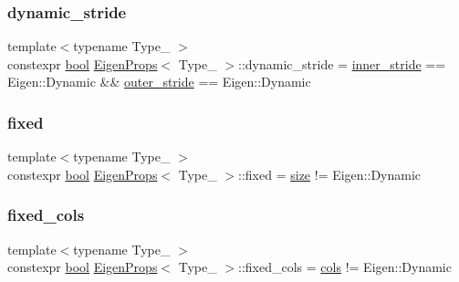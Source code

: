 \mbox{\label{struct_eigen_props_a32861acd4f8d759619f7a3438a5a56a4}} 
\subsubsection{\texorpdfstring{dynamic\_stride}{dynamic\_stride}}
{\footnotesize\ttfamily template$<$typename Type\+\_\+ $>$ \\
constexpr \mbox{\hyperlink{asdl_8h_af6a258d8f3ee5206d682d799316314b1}{bool}} \mbox{\hyperlink{struct_eigen_props}{Eigen\+Props}}$<$ Type\+\_\+ $>$\+::dynamic\+\_\+stride = \mbox{\hyperlink{struct_eigen_props_aadd1cceef220ef97abe8eb74f1f78ecd}{inner\+\_\+stride}} == Eigen\+::\+Dynamic \&\& \mbox{\hyperlink{struct_eigen_props_ac31d9e8cc3baff0f804000486c35759d}{outer\+\_\+stride}} == Eigen\+::\+Dynamic\hspace{0.3cm}{\ttfamily [static]}}

\mbox{\label{struct_eigen_props_a4234c331255e14bd0e2a817ac9e0352e}} 
\subsubsection{\texorpdfstring{fixed}{fixed}}
{\footnotesize\ttfamily template$<$typename Type\+\_\+ $>$ \\
constexpr \mbox{\hyperlink{asdl_8h_af6a258d8f3ee5206d682d799316314b1}{bool}} \mbox{\hyperlink{struct_eigen_props}{Eigen\+Props}}$<$ Type\+\_\+ $>$\+::fixed = \mbox{\hyperlink{_s_d_l__opengl__glext_8h_a3d1e3edfcf61ca2d831883e1afbad89e}{size}} != Eigen\+::\+Dynamic\hspace{0.3cm}{\ttfamily [static]}}

\mbox{\label{struct_eigen_props_afc4954afca9a4dd098b009a5653b2b48}} 
\subsubsection{\texorpdfstring{fixed\_cols}{fixed\_cols}}
{\footnotesize\ttfamily template$<$typename Type\+\_\+ $>$ \\
constexpr \mbox{\hyperlink{asdl_8h_af6a258d8f3ee5206d682d799316314b1}{bool}} \mbox{\hyperlink{struct_eigen_props}{Eigen\+Props}}$<$ Type\+\_\+ $>$\+::fixed\+\_\+cols = \mbox{\hyperlink{struct_eigen_props_a11241a3435168ade35c58f1a2899df8b}{cols}} != Eigen\+::\+Dynamic\hspace{0.3cm}{\ttfamily [static]}}

